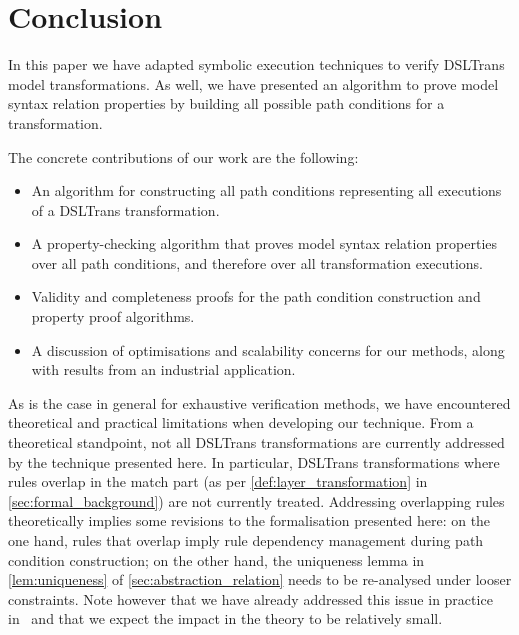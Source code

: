 \section{Conclusion}
\label{sec:conclusion}

In this paper we have adapted symbolic execution techniques to verify DSLTrans
model transformations. As well, we have presented an algorithm to prove model syntax
relation properties by building all possible path conditions for a
transformation.

The concrete contributions of our work are the following:

\begin{itemize}
\item An algorithm for constructing all path conditions representing all executions of a DSLTrans transformation.
\item A property-checking algorithm that proves model syntax relation properties over all path conditions, and therefore over all transformation executions.
\item Validity and completeness proofs for the path condition construction and property proof algorithms.
\item A discussion of optimisations and scalability concerns for our methods, along with results from an industrial application.
\end{itemize}

As is the case in general for exhaustive verification methods, we have encountered theoretical and practical limitations when developing our technique. From a theoretical standpoint, not all DSLTrans transformations are currently addressed by the technique presented here. In particular, DSLTrans transformations where rules overlap in the match part (as per \cref{def:layer_transformation} in \cref{sec:formal_background}) are not currently treated. Addressing overlapping rules theoretically implies some revisions to the formalisation presented here: on the one hand, rules that overlap imply rule dependency management during path condition construction; on the other hand, the uniqueness lemma in \cref{lem:uniqueness} of \cref{sec:abstraction_relation} needs to be re-analysed under looser constraints. Note however that we have already addressed this issue in practice in~\cite{gehan:13,conf/gg/SelimLCDO14} and that we expect the impact in the theory to be relatively small.

